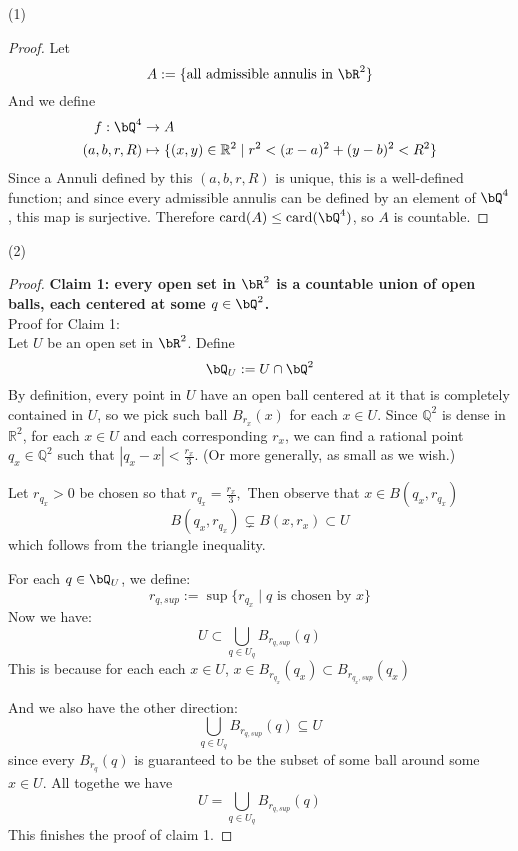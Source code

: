 \documentclass[lang=cn,11pt]{elegantbook}
\begin{document}
(1) \begin{proof} Let 
\[ A:=   \{     \text{all admissible annulis in $\bR^2$}   \}\]
And we define 
\begin{align}
     f:\bQ^4   & \rar A \\
    (a,b,r,R)  & \mapsto \{(x, y) \in \mathbb{R}^2 \mid r^2 < (x - a)^2 + (y - b)^2 < R^2\}
\end{align}
Since a Annuli defined by this $(a,b,r,R)$ is unique, this is a well-defined function; and since every admissible annulis can be defined by an element of $\bQ^4$, this map is surjective. Therefore $\card(A) \leq \card(\bQ^4)$, so $A$ is countable.
\end{proof}
(2) 
\begin{proof}
\noindent \textbf{Claim 1: every open set in $\bR^2$ is a countable union of open balls, each centered at some $q\in \bQ^2$.}\\
\noindent Proof for Claim 1:\\
\noindent Let $U$ be an open set in $\bR^2$.
\noindent Define
\[\bQ_U  :=    U \cap \bQ^2\]
\noindent By definition, every point in $U$ have an open ball centered at it that is completely contained in $U$, so we pick such ball $B_{r_x}(x)$ for each $x \in U$.
\noindent Since \(\mathbb{Q}^2\) is dense in \(\mathbb{R}^2\), for each \(x \in U\) and each corresponding \(r_x\), we can find a rational point \(q_x \in \mathbb{Q}^2\) such that \(|q_x - x| < \frac{r_x}{3}\). (Or more generally, as small as we wish.)

\noindent Let \(r_{q_x} > 0\) be chosen so that 
   \(
     r_{q_x} = \frac{r_x}{3},
   \)
Then observe that $x \in   B(q_x, r_{q_x}) $
     \[
     B(q_x, r_{q_x}) \subsetneq B(x, r_x) \subset U
   \]
\noindent   which follows from the triangle inequality.

For each $q \in \bQ_U$, we define:
\[ r_{q,sup} := \sup\{  r_{q_x}  \mid q  \text{ is chosen by } x         \}     \]
Now we have:
\[  U \subset \bigcup_{q \in U_q}  B_{r_{q,sup}} (q)  \]
\noindent  This is because for each each $x \in U$, $x \in B_{r_{q_x}}(q_x) \subset B_{r_{q_x,sup}}(q_x)$

And we also have the other direction:
\[ \bigcup_{q \in U_q}  B_{r_{q,sup}} (q)   \subseteq U\]
since every $B_{r_q}(q)$ is guaranteed to be the subset of some ball around some $x \in U$. 
All togethe we have
\[
 U = \bigcup_{q \in U_q}  B_{r_{q,sup}} (q)
\]
This finishes the proof of claim 1.


\end{proof}
\end{document}
